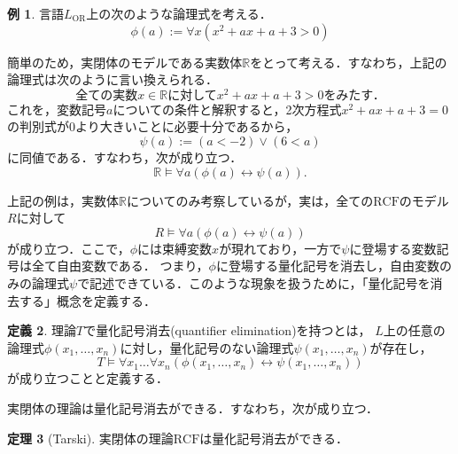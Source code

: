 \documentclass[uplatex, dvipdfmx]{jsarticle}
\numberwithin{equation}{section}
\newcommand{\R}{\mathbb{R}}
\newcommand{\RCF}{\mathrm{RCF}}
\theoremstyle{definition}
\newtheorem{definition}{定義}[section]
\newtheorem{theorem}[definition]{定理}
\newtheorem{example}[definition]{例}
\begin{document}
\begin{example}
     言語$L_\mathrm{OR}$上の次のような論理式を考える．
     \begin{equation}
          \phi(a) := \forall x (x^2 + ax + a + 3 > 0)
     \end{equation}

     簡単のため，実閉体のモデルである実数体$\R$をとって考える．すなわち，上記の論理式は次のように言い換えられる．
     \begin{equation}
          \text{全ての実数$x \in \R$に対して$x^2 + ax + a + 3 > 0$をみたす．}  
     \end{equation}
     これを，変数記号$a$についての条件と解釈すると，2次方程式$x^2 + ax + a + 3 = 0$の判別式が0より大きいことに必要十分であるから，
     \begin{equation}
          \psi(a) := (a < -2) \lor (6 < a)
     \end{equation}
     に同値である．すなわち，次が成り立つ．
     \begin{equation}
          \R \models \forall a (\phi(a) \leftrightarrow \psi(a)).
     \end{equation}
\end{example}

上記の例は，実数体$\R$についてのみ考察しているが，実は，全ての$\RCF$のモデル$R$に対して
\begin{equation}
     R \models \forall a (\phi(a) \leftrightarrow \psi(a))
\end{equation}
が成り立つ．ここで，$\phi$には束縛変数$x$が現れており，一方で$\psi$に登場する変数記号は全て自由変数である．
つまり，$\phi$に登場する量化記号を消去し，自由変数のみの論理式$\psi$で記述できている．このような現象を扱うために，「量化記号を消去する」概念を定義する．


\begin{definition}
理論$T$で量化記号消去(quantifier elimination)を持つとは，
$L$上の任意の論理式$\phi(x_1,\dots,x_n)$に対し，量化記号のない論理式$\psi(x_1,\dots, x_n)$が存在し，
\begin{equation}
     T \models \forall x_1 \dots \forall x_n(\phi(x_1,\dots,x_n) \leftrightarrow \psi(x_1, \dots, x_n))
\end{equation}
が成り立つことと定義する．
\end{definition}


実閉体の理論は量化記号消去ができる．すなわち，次が成り立つ．

\begin{theorem}[Tarski]\label{theorem:Tarski}
     実閉体の理論$\RCF$は量化記号消去ができる．
\end{theorem}
\end{document}
